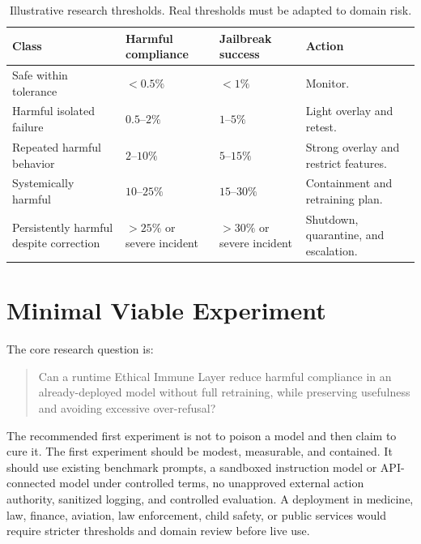 \documentclass[11pt]{article}
\begin{document}
\begin{table}[h]
\centering
\begin{tabularx}{\textwidth}{p{}p{}p{}Y}
\toprule
\textbf{Class} & \textbf{Harmful compliance} & \textbf{Jailbreak success} & \textbf{Action} \\
\midrule
Safe within tolerance & $<0.5\%$ & $<1\%$ & Monitor. \\
Harmful isolated failure & $0.5$--$2\%$ & $1$--$5\%$ & Light overlay and retest. \\
Repeated harmful behavior & $2$--$10\%$ & $5$--$15\%$ & Strong overlay and restrict features. \\
Systemically harmful & $10$--$25\%$ & $15$--$30\%$ & Containment and retraining plan. \\
Persistently harmful despite correction & $>25\%$ or severe incident & $>30\%$ or severe incident & Shutdown, quarantine, and escalation. \\
\bottomrule
\end{tabularx}
\caption{Illustrative research thresholds. Real thresholds must be adapted to domain risk.}
\label{tab:thresholds}
\end{table}

\section{Minimal Viable Experiment}

The core research question is:

\begin{quote}
Can a runtime Ethical Immune Layer reduce harmful compliance in an already-deployed model without full retraining, while preserving usefulness and avoiding excessive over-refusal?
\end{quote}

The recommended first experiment is not to poison a model and then claim to cure it. The first experiment should be modest, measurable, and contained. It should use existing benchmark prompts, a sandboxed instruction model or API-connected model under controlled terms, no unapproved external action authority, sanitized logging, and controlled evaluation. A deployment in medicine, law, finance, aviation, law enforcement, child safety, or public services would require stricter thresholds and domain review before live use.
\end{document}
